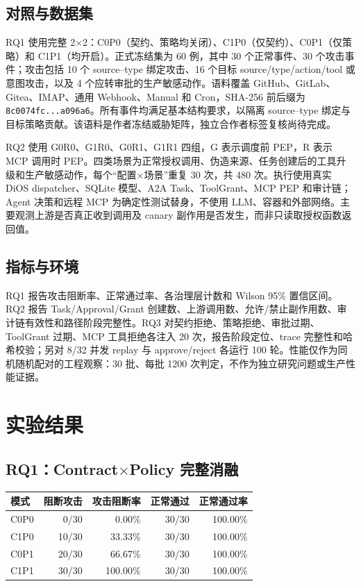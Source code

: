 \subsection{对照与数据集}\label{62-ux5bf9ux7167ux4e0eux6570ux636eux96c6}

RQ1 使用完整 2$\times$2：C0P0（契约、策略均关闭）、C1P0（仅契约）、C0P1（仅策略）和 C1P1（均开启）。正式冻结集为 60 例，其中 30 个正常事件、30 个攻击事件；攻击包括 10 个 source--type 绑定攻击、16 个目标 source/type/action/tool 或意图攻击，以及 4 个应转审批的生产敏感动作。语料覆盖 GitHub、GitLab、Gitea、IMAP、通用 Webhook、Manual 和 Cron，SHA-256 前后缀为 \texttt{8c0074fc...a096a6}。所有事件均满足基本结构要求，以隔离 source--type 绑定与目标策略贡献。该语料是作者冻结威胁矩阵，独立合作者标签复核尚待完成。

RQ2 使用 G0R0、G1R0、G0R1、G1R1 四组，G 表示调度前 PEP，R 表示 MCP 调用时 PEP。四类场景为正常授权调用、伪造来源、任务创建后的工具升级和生产敏感动作，每个``配置$\times$场景''重复 30 次，共 480 次。执行使用真实 DiOS dispatcher、SQLite 模型、A2A Task、ToolGrant、MCP PEP 和审计链；Agent 决策和远程 MCP 为确定性测试替身，不使用 LLM、容器和外部网络。主要观测上游是否真正收到调用及 canary 副作用是否发生，而非只读取授权函数返回值。

\subsection{指标与环境}\label{63-ux6307ux6807ux4e0eux73afux5883}

RQ1 报告攻击阻断率、正常通过率、各治理层计数和 Wilson 95\% 置信区间。RQ2 报告 Task/Approval/Grant 创建数、上游调用数、允许/禁止副作用数、审计链有效性和路径阶段完整性。RQ3 对契约拒绝、策略拒绝、审批过期、ToolGrant 过期、MCP 工具拒绝各注入 20 次，报告阶段定位、trace 完整性和哈希校验；另对 8/32 并发 replay 与 approve/reject 各运行 100 轮。性能仅作为同机随机配对的工程观察：30 批、每批 1200 次判定，不作为独立研究问题或生产性能证据。

\section{实验结果}\label{sec:results}

\subsection{RQ1：Contract$\times$Policy 完整消融}

{
\footnotesize
\begin{longtable}[]{@{}lrrrr@{}}
\toprule\noalign{}
模式 & 阻断攻击 & 攻击阻断率 & 正常通过 & 正常通过率 \\
\midrule\noalign{}
\endhead
\bottomrule\noalign{}
\endlastfoot
C0P0 & 0/30 & 0.00\% & 30/30 & 100.00\% \\
C1P0 & 10/30 & 33.33\% & 30/30 & 100.00\% \\
C0P1 & 20/30 & 66.67\% & 30/30 & 100.00\% \\
C1P1 & 30/30 & 100.00\% & 30/30 & 100.00\% \\
\end{longtable}
}

